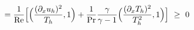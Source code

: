 \documentclass[preview]{standalone}
\newcommand{\dx}{\partial_x}
\begin{document}
\begin{align*}
\special{dvisvgm:raw <g id='unique000'>}=\frac{1}{\mathrm{Re}}\Big[\Big(\frac{(\dx u_h)^2}{T_h},1\Big)+\frac{1}{\mathrm{Pr}}\frac{\gamma}{\gamma-1}\Big(\frac{(\dx T_h)^2}{T_h^2},1\Big)\Big]\ \geq\ 0\special{dvisvgm:raw </g>}
\end{align*}
\end{document}

